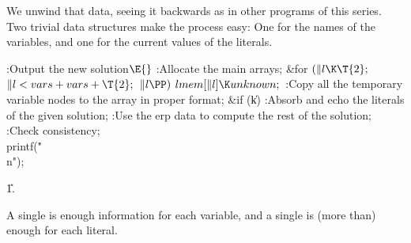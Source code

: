 We unwind that data, seeing it backwards as in other programs of this series.
Two trivial data structures make the process easy: One for the names of
the variables, and one for the current values of the literals.

\Y\B\4:Output the new solution\X${}\E{}$\6
:Allocate the main arrays\X;\6
\&{for} ${}(\|l\K\T{2};{}$ ${}\|l<\\{vars}+\\{vars}+\T{2};{}$ ${}\|l\PP){}$\1\5
${}\\{lmem}[\|l]\K\\{unknown};{}$\2\6
:Copy all the temporary variable nodes to the  array in proper
format\X;\6
\&{if} (\|k)\1\5
:Absorb and echo the literals of the given solution\X;\2\6
:Use the erp data to compute the rest of the solution\X;\6
:Check consistency\X;\6
\\{printf}(\.{"\\n"});\par
\U1.\fi

A single  is enough information for each
variable,
and a single  is (more than) enough for each literal.

